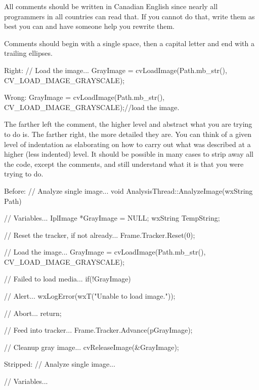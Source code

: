 \startitemize[3]
\setupwhitespace[big]
\item
All comments should be written in Canadian English since nearly all programmers in all countries can read that. If you cannot do that, write them as best you can and have someone help you rewrite them.

\item
Comments should begin with a single space, then a capital letter and end with a trailing ellipses. 

Right:
\startCodeExample
\starttyping
// Load the image...
GrayImage = cvLoadImage(Path.mb_str(), CV_LOAD_IMAGE_GRAYSCALE);
\stoptyping
\stopCodeExample

Wrong:
\startCodeExample
\starttyping
GrayImage = cvLoadImage(Path.mb_str(), CV_LOAD_IMAGE_GRAYSCALE);//load the image.
\stoptyping
\stopCodeExample

\item
The farther left the comment, the higher level and abstract what you are trying to do is. The farther right, the more detailed they are. You can think of a given level of indentation as elaborating on how to carry out what was described at a higher (less indented) level. It should be possible in many cases to strip away all the code, except the comments, and still understand what it is that you were trying to do.

Before:
\startCodeExample
\starttyping
// Analyze single image...
void AnalysisThread::AnalyzeImage(wxString Path)
{
    // Variables...
    IplImage   *GrayImage   = NULL;
    wxString    TempString;

    // Reset the tracker, if not already...
    Frame.Tracker.Reset(0);

    // Load the image...
    GrayImage = cvLoadImage(Path.mb_str(), CV_LOAD_IMAGE_GRAYSCALE);

        // Failed to load media...
        if(!GrayImage)
        {
            // Alert...
            wxLogError(wxT("Unable to load image."));
            
            // Abort...
            return;
        }

    // Feed into tracker...
    Frame.Tracker.Advance(pGrayImage);
    
    // Cleanup gray image...
    cvReleaseImage(&GrayImage);
}
\stoptyping
\stopCodeExample

Stripped:
\startCodeExample
\starttyping
// Analyze single image...

    // Variables...

